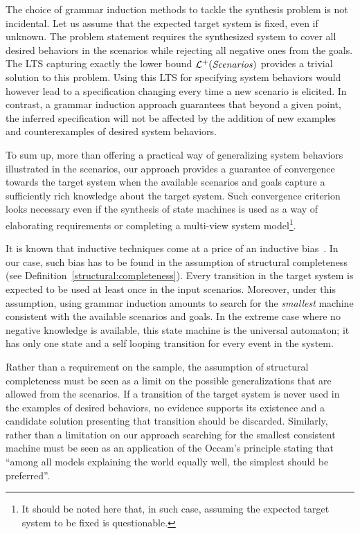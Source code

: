 The choice of grammar induction methods to tackle the synthesis problem is not incidental. Let us assume that the expected target system is fixed, even if unknown. The problem statement requires the synthesized system to cover all desired behaviors in the scenarios while rejecting all negative ones from the goals. The LTS capturing exactly the lower bound $\mathcal{L}^+(\mbox{\emph{Scenarios}})$ provides a trivial solution to this problem. Using this LTS for specifying system behaviors would however lead to a specification changing every time a new scenario is elicited. In contrast, a grammar induction approach guarantees that beyond a given point, the inferred specification will not be affected by the addition of new examples and counterexamples of desired system behaviors. 

To sum up, more than offering a practical way of generalizing system behaviors illustrated in the scenarios, our approach provides a guarantee of convergence towards the target system when the available scenarios and goals capture a sufficiently rich knowledge about the target system. Such convergence criterion looks necessary even if the synthesis of state machines is used as a way of elaborating requirements or completing a multi-view system model\footnote{It should be noted here that, in such case, assuming the expected target system to be fixed is questionable.}.

It is known that inductive techniques come at a price of an inductive bias~\cite{Mitchell:1980}. In our case, such bias has to be found in the assumption of structural completeness (see Definition~\ref{structural:completeness}). Every transition in the target system is expected to be used at least once in the input scenarios. Moreover, under this assumption, using grammar induction amounts to search for the \emph{smallest} machine consistent with the available scenarios and goals. In the extreme case where no negative knowledge is available, this state machine is the universal automaton; it has only one state and a self looping transition for every event in the system.

Rather than a requirement on the sample, the assumption of structural completeness must be seen as a limit on the possible generalizations that are allowed from the scenarios. If a transition of the target system is never used in the examples of desired behaviors, no evidence supports its existence and a candidate solution presenting that transition should be discarded. Similarly, rather than a limitation on our approach searching for the smallest consistent machine must be seen as an application of the Occam's principle stating that ``among all models explaining the world equally well, the simplest should be preferred''.

